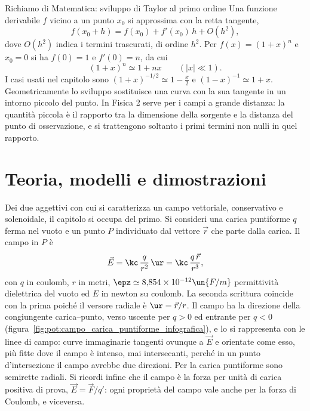 \documentclass[main.tex]{subfiles}
\begin{document}
	\begin{riquadro}{Richiamo di Matematica: sviluppo di Taylor al primo ordine}
		Una funzione derivabile $f$ vicino a un punto $x_0$ si approssima con la retta tangente,
		\[
		f(x_0+h)=f(x_0)+f'(x_0)\,h+O(h^2),
		\]
		dove $O(h^2)$ indica i termini trascurati, di ordine $h^2$. Per $f(x)=(1+x)^n$ e $x_0=0$ si ha $f(0)=1$ e $f'(0)=n$, da cui
		\[
		(1+x)^n\simeq1+nx\qquad(|x|\ll1).
		\]
		I casi usati nel capitolo sono $(1+x)^{-1/2}\simeq1-\tfrac{x}{2}$ e $(1-x)^{-1}\simeq1+x$. Geometricamente lo sviluppo sostituisce una curva con la sua tangente in un intorno piccolo del punto. In Fisica 2 serve per i campi a grande distanza: la quantità piccola è il rapporto tra la dimensione della sorgente e la distanza del punto di osservazione, e si trattengono soltanto i primi termini non nulli in quel rapporto.
	\end{riquadro}
	
	\section*{Teoria, modelli e dimostrazioni}
	
	Dei due aggettivi con cui si caratterizza un campo vettoriale, conservativo e solenoidale, il capitolo si occupa del primo. Si consideri una carica puntiforme $q$ ferma nel vuoto e un punto $P$ individuato dal vettore $\vec r$ che parte dalla carica. Il campo in $P$ è
	\[
	\vec E=\kc\,\frac{q}{r^2}\,\ur=\kc\,\frac{q\,\vec r}{r^3},
	\]
	con $q$ in coulomb, $r$ in metri, $\epz\simeq8{,}854\times10^{-12}\un{F/m}$ permittività dielettrica del vuoto ed $E$ in newton su coulomb. La seconda scrittura coincide con la prima poiché il versore radiale è $\ur=\vec r/r$. Il campo ha la direzione della congiungente carica--punto, verso uscente per $q>0$ ed entrante per $q<0$ (figura~\ref{fig:pot:campo_carica_puntiforme_infografica}), e lo si rappresenta con le linee di campo: curve immaginarie tangenti ovunque a $\vec E$ e orientate come esso, più fitte dove il campo è intenso, mai intersecanti, perché in un punto d'intersezione il campo avrebbe due direzioni. Per la carica puntiforme sono semirette radiali. Si ricordi infine che il campo è la forza per unità di carica positiva di prova, $\vec E=\vec F/q'$: ogni proprietà del campo vale anche per la forza di Coulomb, e viceversa.
	
\end{document}

